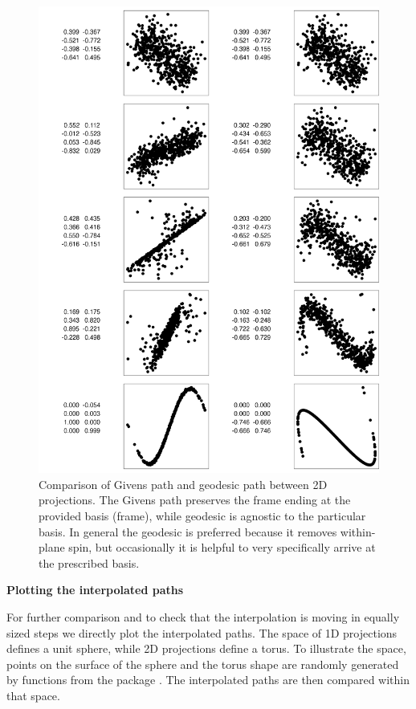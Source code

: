 \begin{Schunk}
\begin{figure}

{\centering \includegraphics[width=0.8\linewidth]{figures/compare-paths} 

}

\caption[Comparison of Givens path and geodesic path between 2D projections]{Comparison of Givens path and geodesic path between 2D projections. The Givens path preserves the frame ending at the provided basis (frame), while geodesic is agnostic to the particular basis. In general the geodesic is preferred because it removes within-plane spin, but occasionally it is helpful to very specifically arrive at the prescribed basis.}\label{fig:compare-paths}
\end{figure}
\end{Schunk}

\textbf{Plotting the interpolated paths}

For further comparison and to check that the interpolation is moving in
equally sized steps we directly plot the interpolated paths. The space
of 1D projections defines a unit sphere, while 2D projections define a
torus. To illustrate the space, points on the surface of the sphere and
the torus shape are randomly generated by functions from the
 package \citep{geozoo}. The interpolated paths are then
compared within that space.

